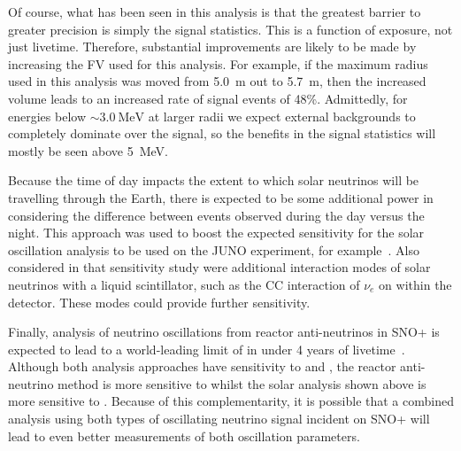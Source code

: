 Of course, what has been seen in this analysis is that the greatest barrier to greater precision is simply the signal statistics. This is a function of exposure, not just livetime. Therefore, substantial improvements are likely to be made by increasing the FV used for this analysis. For example, if the maximum radius used in this analysis was moved from \SI{5.0}{\metre} out to \SI{5.7}{\metre}, then the increased volume leads to an increased rate of signal events of 48\%. Admittedly, for energies below $\sim\SI{3.0}{\MeV}$ at larger radii we expect external backgrounds to completely dominate over the signal, so the benefits in the signal statistics will mostly be seen above \SI{5}{\MeV}.

Because the time of day impacts the extent to which solar neutrinos will be travelling through the Earth, there is expected to be some additional power in considering the difference between events observed during the day versus the night. This approach was used to boost the expected sensitivity for the solar oscillation analysis to be used on the JUNO experiment, for example~\cite{}. %
Also considered in that sensitivity study were additional interaction modes of solar neutrinos with a liquid scintillator, such as the CC interaction of $\nu_{e}$ on  within the detector. These modes could provide further sensitivity.

Finally, analysis of neutrino oscillations from reactor anti-neutrinos in SNO+ is expected to lead to a world-leading limit of \dmsq{} in under 4 years of livetime~\cite{morton-blakeFirstMeasurementReactor2021}. Although both analysis approaches have sensitivity to \dmsq{} and \tonetwo{}, the reactor anti-neutrino method is more sensitive to \dmsq{} whilst the solar analysis shown above is more sensitive to \tonetwo{}. Because of this complementarity, it is possible that a combined analysis using both types of oscillating neutrino signal incident on SNO+ will lead to even better measurements of both oscillation parameters.


